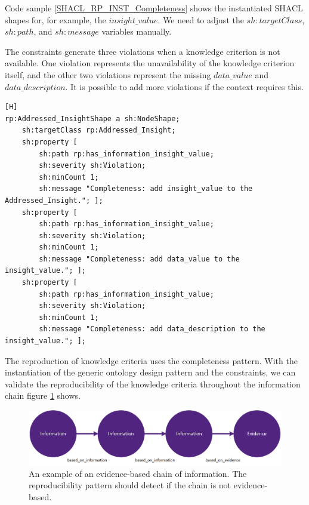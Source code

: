 Code sample \ref{SHACL_RP_INST_Completeness} shows the instantiated SHACL shapes for, for example, the $insight\_value$. We need to adjust the $sh:targetClass$, $sh:path$, and $sh:message$ variables manually.

The constraints generate three violations when a knowledge criterion is not available. One violation represents the unavailability of the knowledge criterion itself, and the other two violations represent the missing $data\_value$ and $data\_description$. It is possible to add more violations if the context requires this.

\begin{lstlisting}[float,language=SHACL,caption={An example of instantiated SHACL shapes for the data property $insight\_value$. We instantiate this code sample for each knowledge criterion and for each information required to reproduce a knowledge criterion.},label={SHACL_RP_INST_Completeness}][H]
rp:Addressed_InsightShape a sh:NodeShape;
	sh:targetClass rp:Addressed_Insight; 
	sh:property [
		sh:path rp:has_information_insight_value;
		sh:severity sh:Violation; 
		sh:minCount 1; 
		sh:message "Completeness: add insight_value to the Addressed_Insight."; ];
	sh:property [
		sh:path rp:has_information_insight_value;
		sh:severity sh:Violation; 
		sh:minCount 1; 
		sh:message "Completeness: add data_value to the insight_value."; ];
	sh:property [
		sh:path rp:has_information_insight_value;
		sh:severity sh:Violation; 
		sh:minCount 1; 
		sh:message "Completeness: add data_description to the insight_value."; ];
\end{lstlisting}

The reproduction of knowledge criteria uses the completeness pattern. With the instantiation of the generic ontology design pattern and the constraints, we can validate the reproducibility of the knowledge criteria throughout the information chain figure \ref{fig:reproducibility_chain_val_rp} shows.

\begin{figure}[H]
\centering
  \includegraphics[width=12cm]{../../Images/Reproducibility_Chain.png}
  \caption{An example of an evidence-based chain of information. The reproducibility pattern should detect if the chain is not evidence-based.}
  \label{fig:reproducibility_chain_val_rp}
\end{figure} 

